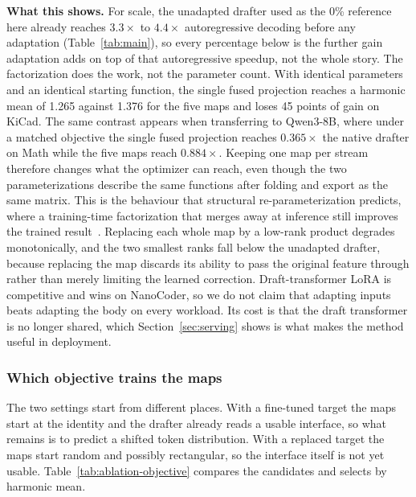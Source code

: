 \textbf{What this shows.} For scale, the unadapted drafter used as the 0\% reference here already reaches $3.3\times$ to $4.4\times$ autoregressive decoding before any adaptation (Table~\ref{tab:main}), so every percentage below is the further gain adaptation adds on top of that autoregressive speedup, not the whole story. The factorization does the work, not the parameter count. With identical parameters and an identical starting function, the single fused projection reaches a harmonic mean of 1.265 against 1.376 for the five maps and loses 45 points of gain on KiCad. The same contrast appears when transferring to Qwen3-8B, where under a matched objective the single fused projection reaches $0.365\times$ the native drafter on Math while the five maps reach $0.884\times$. Keeping one map per stream therefore changes what the optimizer can reach, even though the two parameterizations describe the same functions after folding and export as the same matrix. This is the behaviour that structural re-parameterization predicts, where a training-time factorization that merges away at inference still improves the trained result~\citep{huo2026repspec}. Replacing each whole map by a low-rank product degrades monotonically, and the two smallest ranks fall below the unadapted drafter, because replacing the map discards its ability to pass the original feature through rather than merely limiting the learned correction. Draft-transformer LoRA is competitive and wins on NanoCoder, so we do not claim that adapting inputs beats adapting the body on every workload. Its cost is that the draft transformer is no longer shared, which Section~\ref{sec:serving} shows is what makes the method useful in deployment.

\subsubsection{Which objective trains the maps}
\label{sec:ablation-objective}
The two settings start from different places. With a fine-tuned target the maps start at the identity and the drafter already reads a usable interface, so what remains is to predict a shifted token distribution. With a replaced target the maps start random and possibly rectangular, so the interface itself is not yet usable. Table~\ref{tab:ablation-objective} compares the candidates and selects by harmonic mean.

